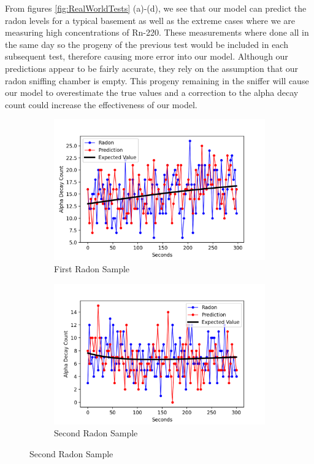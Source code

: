 \documentclass[11pt]{m2pi}
\begin{document}
From figures \ref{fig:RealWorldTests} (a)-(d), we see that our model can predict the radon levels for a typical basement as well as the extreme cases where we are measuring high concentrations of Rn-220. These measurements where done all in the same day so the progeny of the previous test would be included in each subsequent test, therefore causing more error into our model. Although our predictions appear to be fairly accurate, they rely on the assumption that our radon sniffing chamber is empty. This progeny remaining in the sniffer will cause our model to overestimate the true values and a correction to the alpha decay count could increase the effectiveness of our model.
\begin{figure}[h]
        \centering
        \begin{subfigure}[c]{0.475\textwidth}
            \centering
            \includegraphics[scale=0.425]{images/Radon_Trial1.png}
            \caption[Network2]%
            {{\tiny First Radon Sample}}    
            \label{fig:RadonTrial1}
        \end{subfigure}
        \begin{subfigure}[c]{0.475\textwidth}  
            \centering 
            \includegraphics[scale=0.425]{images/Radon_Trial2.png}
            \caption[]%
            {{\tiny Second Radon Sample}}    
            \label{fig:RadonTrial2}
        \end{subfigure}
\end{figure}
\end{document}
